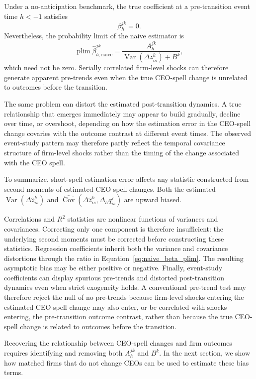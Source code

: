 \documentclass[11pt,a4paper]{article}
\begin{document}
Under a no-anticipation benchmark, the true coefficient at a
pre-transition event time $h<-1$ satisfies
\[
\beta_h^{jk}=0.
\]
Nevertheless, the probability limit of the naive estimator is
\begin{equation}
\operatorname{plim}
\widehat\beta_{h,\mathrm{naive}}^{jk}
=
\frac{
A_h^{jk}
}{
\operatorname{Var}\!\left(
\Delta z_{is}^{k}
\right)
+
B^{k}
},
\label{eq:pretrend_bias}
\end{equation}
which need not be zero. Serially correlated firm-level shocks can
therefore generate apparent pre-trends even when the true CEO-spell
change is unrelated to outcomes before the transition.

The same problem can distort the estimated post-transition dynamics.
A true relationship that emerges immediately may appear to build
gradually, decline over time, or overshoot, depending on how the
estimation error in the CEO-spell change covaries with the outcome
contrast at different event times. The observed event-study pattern
may therefore partly reflect the temporal covariance structure of
firm-level shocks rather than the timing of the change associated with
the CEO spell.

To summarize, short-spell estimation error affects any statistic constructed from
second moments of estimated CEO-spell changes. Both the estimated $\operatorname{Var}\!\left(
\Delta\widehat z_{is}^{k} \right)$ and $\widehat{\operatorname{Cov}}\!\left(
\Delta\widehat z_{is}^{k}, \Delta_h q_{is}^{j} \right)$ are upward biased. 

Correlations and $R^2$ statistics are nonlinear functions of variances and covariances. Correcting only one component is therefore insufficient: the underlying second moments must be corrected before constructing these statistics. Regression coefficients inherit both the variance and covariance distortions through the ratio in Equation~\eqref{eq:naive_beta_plim}. The resulting asymptotic bias may be either positive or negative. Finally, event-study coefficients can display spurious pre-trends and distorted post-transition dynamics even when strict exogeneity holds. A conventional pre-trend test may therefore reject the null of no pre-trends because firm-level shocks entering the estimated CEO-spell change may also enter, or be correlated with shocks entering, the pre-transition outcome contrast, rather than because the true CEO-spell change is related to outcomes before the transition.

Recovering the relationship between CEO-spell changes and firm outcomes requires identifying and removing both $A_h^{jk}$ and $B^{k}$. In the next section, we show how matched firms that do not change CEOs can be used to estimate these bias terms.
\end{document}
